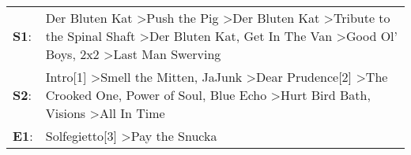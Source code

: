 \begin{supertabular}{p{0.03\textwidth}p{0.92\textwidth}}
 \textbf{S1}:  &      Der Bluten Kat\textsuperscript{} \textgreater \enspace Push the Pig\textsuperscript{} \textgreater \enspace Der Bluten Kat\textsuperscript{} \textgreater \enspace Tribute to the Spinal Shaft\textsuperscript{} \textgreater \enspace Der Bluten Kat\textsuperscript{}, \enspace Get In The Van\textsuperscript{} \textgreater \enspace Good Ol' Boys\textsuperscript{}, \enspace 2x2\textsuperscript{} \textgreater \enspace Last Man Swerving\textsuperscript{}  \enspace  \\
 \textbf{S2}:  &  Intro[1]\textsuperscript{} \textgreater \enspace Smell the Mitten\textsuperscript{}, \enspace JaJunk\textsuperscript{} \textgreater \enspace Dear Prudence[2]\textsuperscript{} \textgreater \enspace The Crooked One\textsuperscript{}, \enspace Power of Soul\textsuperscript{}, \enspace Blue Echo\textsuperscript{} \textgreater \enspace Hurt Bird Bath\textsuperscript{}, \enspace Visions\textsuperscript{} \textgreater \enspace All In Time\textsuperscript{}  \enspace  \\
 \textbf{E1}:  &                                                                                                                                                                                                                                                                                                                                                                                 Solfegietto[3]\textsuperscript{} \textgreater \enspace Pay the Snucka\textsuperscript{}  \enspace  \\
\end{supertabular}

